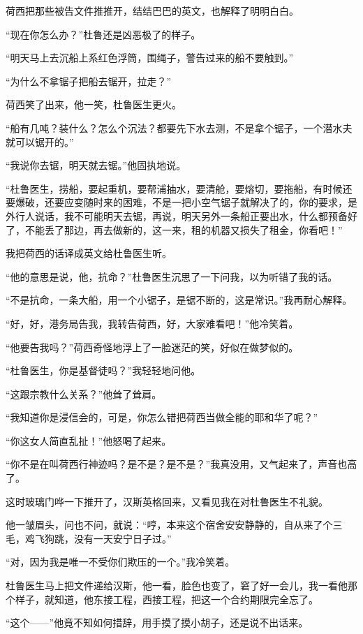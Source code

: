 \par 荷西把那些被告文件推推开，结结巴巴的英文，也解释了明明白白。
\par “现在你怎么办？”杜鲁还是凶恶极了的样子。
\par “明天马上去沉船上系红色浮筒，围绳子，警告过来的船不要触到。”
\par “为什么不拿锯子把船去锯开，拉走？”
\par 荷西笑了出来，他一笑，杜鲁医生更火。
\par “船有几吨？装什么？怎么个沉法？都要先下水去测，不是拿个锯子，一个潜水夫就可以锯开的。”
\par “我说你去锯，明天就去锯。”他固执地说。
\par “杜鲁医生，捞船，要起重机，要帮浦抽水，要清舱，要熔切，要拖船，有时候还要爆破，还要应变随时来的困难，不是一把小空气锯子就解决了的，你的要求，是外行人说话，我不可能明天去锯，再说，明天另外一条船正要出水，什么都预备好了，不能丢了那边，再去做新的，这一来，租的机器又损失了租金，你看吧！”
\par 我把荷西的话译成英文给杜鲁医生听。
\par “他的意思是说，他，抗命？”杜鲁医生沉思了一下问我，以为听错了我的话。
\par “不是抗命，一条大船，用一个小锯子，是锯不断的，这是常识。”我再耐心解释。
\par “好，好，港务局告我，我转告荷西，好，大家难看吧！”他冷笑着。
\par “他要告我吗？”荷西奇怪地浮上了一脸迷茫的笑，好似在做梦似的。
\par “杜鲁医生，你是基督徒吗？”我轻轻地问他。
\par “这跟宗教什么关系？”他耸了耸肩。
\par “我知道你是浸信会的，可是，你怎么错把荷西当做全能的耶和华了呢？”
\par “你这女人简直乱扯！”他怒喝了起来。
\par “你不是在叫荷西行神迹吗？是不是？是不是？”我真没用，又气起来了，声音也高了。
\par 这时玻璃门哗一下推开了，汉斯英格回来，又看见我在对杜鲁医生不礼貌。
\par 他一皱眉头，问也不问，就说：“哼，本来这个宿舍安安静静的，自从来了个三毛，鸡飞狗跳，没有一天安宁日子过。”
\par “对，因为我是唯一不受你们欺压的一个。”我冷笑着。
\par 杜鲁医生马上把文件递给汉斯，他一看，脸色也变了，窘了好一会儿，我一看他那个样子，就知道，他东接工程，西接工程，把这一个合约期限完全忘了。
\par “这个——”他竟不知如何措辞，用手摸了摸小胡子，还是说不出话来。
